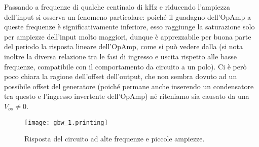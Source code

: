 Passando a frequenze di qualche centinaio di \si{\kHz} e riducendo l'ampiezza dell'input si osserva un fenomeno particolare: poiché il guadagno dell'OpAmp a queste frequenze è significativamente inferiore, esso raggiunge la saturazione solo per ampiezze dell'input molto maggiori, dunque è apprezzabile per buona parte del periodo la risposta lineare dell'OpAmp, come si può vedere dalla  (si nota inoltre la diversa relazione tra le fasi di ingresso e uscita rispetto alle basse frequenze, compatibile con il comportamento da circuito a un polo). Ci è però poco chiara la ragione dell'offset dell'output, che non sembra dovuto ad un possibile offset del generatore (poiché permane anche inserendo un condensatore tra questo e l'ingresso invertente dell'OpAmp) né riteniamo sia causato da una $V_{os} \neq 0$. %

\begin{figure}[h]
	\centering
	\texttt{[image: gbw\_1.printing]}
	\caption{Risposta del circuito ad alte frequenze e piccole ampiezze.}
	\label{f:gbw}
\end{figure}
